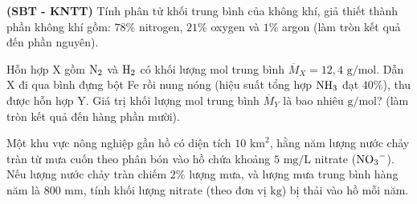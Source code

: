 \documentclass[12pt,a4paper]{article}
\begin{document}
\begin{ex}
\textbf{(SBT - KNTT)} Tính phân tử khối trung bình của không khí, giả thiết thành phần không khí gồm: $78\%$ nitrogen, $21\%$ oxygen và $1\%$ argon (làm tròn kết quả đến phần nguyên).

\end{ex}

\begin{ex}
Hỗn hợp X gồm $\ce{N2}$ và $\ce{H2}$ có khối lượng mol trung bình $\overline{M}_X = 12{,}4\text{ g/mol}$. Dẫn X đi qua bình đựng bột Fe rồi nung nóng (hiệu suất tổng hợp $\ce{NH3}$ đạt $40\%$), thu được hỗn hợp Y. Giá trị khối lượng mol trung bình $\overline{M}_Y$ là bao nhiêu $\text{g/mol}$? (làm tròn kết quả đến hàng phần mười).

\end{ex}

\begin{ex}
Một khu vực nông nghiệp gần hồ có diện tích $10\text{ km}^2$, hằng năm lượng nước chảy tràn từ mưa cuốn theo phân bón vào hồ chứa khoảng $5\text{ mg/L}$ nitrate ($\ce{NO3-}$). Nếu lượng nước chảy tràn chiếm $2\%$ lượng mưa, và lượng mưa trung bình hàng năm là $800\text{ mm}$, tính khối lượng nitrate (theo đơn vị $\text{kg}$) bị thải vào hồ mỗi năm.

\end{ex}
\end{document}
